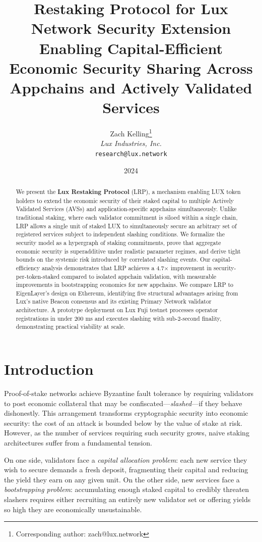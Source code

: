 \documentclass[11pt]{article}
\title{\textbf{Restaking Protocol for Lux Network Security Extension}\\
\large Enabling Capital-Efficient Economic Security Sharing Across Appchains and Actively Validated Services}
\author{
Zach Kelling\thanks{Corresponding author: zach@lux.network}\\
\textit{Lux Industries, Inc.}\\
\texttt{research@lux.network}
}
\date{2024}
\begin{document}
\luxcoverpage

\begin{abstract}
We present the \textbf{Lux Restaking Protocol} (LRP), a mechanism enabling LUX token holders
to extend the economic security of their staked capital to multiple Actively Validated Services
(AVSs) and application-specific appchains simultaneously. Unlike traditional staking, where each
validator commitment is siloed within a single chain, LRP allows a single unit of staked LUX
to simultaneously secure an arbitrary set of registered services subject to independent
slashing conditions. We formalize the security model as a hypergraph of staking commitments,
prove that aggregate economic security is superadditive under realistic parameter regimes, and
derive tight bounds on the systemic risk introduced by correlated slashing events. Our
capital-efficiency analysis demonstrates that LRP achieves a 4.7$\times$ improvement in
security-per-token-staked compared to isolated appchain validation, with measurable improvements
in bootstrapping economics for new appchains. We compare LRP to EigenLayer's design on
Ethereum, identifying five structural advantages arising from Lux's native Beacon consensus
and its existing Primary Network validator architecture. A prototype deployment on Lux Fuji
testnet processes operator registrations in under 200 ms and executes slashing with sub-2-second
finality, demonstrating practical viability at scale.
\end{abstract}

\tableofcontents
\newpage

\section{Introduction}

Proof-of-stake networks achieve Byzantine fault tolerance by requiring validators to post
economic collateral that may be confiscated---\emph{slashed}---if they behave dishonestly.
This arrangement transforms cryptographic security into economic security: the cost of an
attack is bounded below by the value of stake at risk. However, as the number of services
requiring such security grows, naive staking architectures suffer from a fundamental tension.

On one side, validators face a \emph{capital allocation problem}: each new service they wish
to secure demands a fresh deposit, fragmenting their capital and reducing the yield they
earn on any given unit. On the other side, new services face a \emph{bootstrapping problem}:
accumulating enough staked capital to credibly threaten slashers requires either recruiting
an entirely new validator set or offering yields so high they are economically unsustainable.
\end{document}
